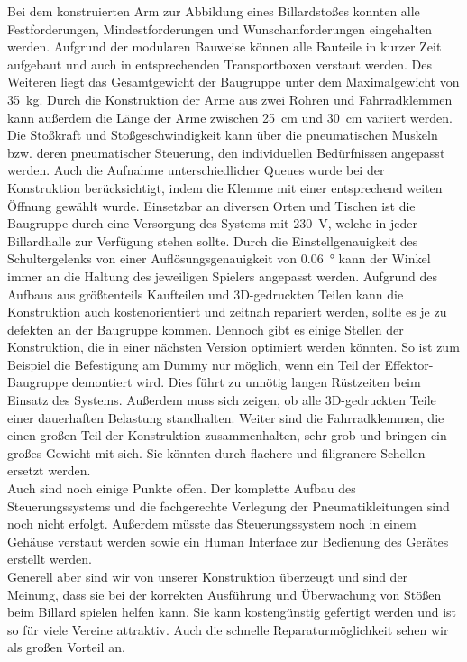	Bei dem konstruierten Arm zur Abbildung eines Billardstoßes konnten alle Festforderungen, Mindestforderungen und Wunschanforderungen eingehalten werden.
	Aufgrund der modularen Bauweise können alle Bauteile in kurzer Zeit aufgebaut und auch in entsprechenden Transportboxen verstaut werden.
	Des Weiteren liegt das Gesamtgewicht der Baugruppe unter dem Maximalgewicht von \SI{35}{\kilo\gram}.
	Durch die Konstruktion der Arme aus zwei Rohren und Fahrradklemmen kann außerdem die Länge der Arme zwischen \SI{25}{\cm} und \SI{30}{\cm} variiert werden.
	Die Stoßkraft und Stoßgeschwindigkeit kann über die pneumatischen Muskeln bzw. deren pneumatischer Steuerung, den individuellen Bedürfnissen angepasst werden.
	Auch die Aufnahme unterschiedlicher Queues wurde bei der Konstruktion berücksichtigt, indem die Klemme mit einer entsprechend weiten Öffnung gewählt wurde.
	Einsetzbar an diversen Orten und Tischen ist die Baugruppe durch eine Versorgung des Systems mit \SI{230}{\volt}, welche in jeder Billardhalle zur Verfügung stehen sollte. 
	Durch die Einstellgenauigkeit des Schultergelenks von einer Auflösungsgenauigkeit von \SI{0,06}{\degree} kann der Winkel immer an die Haltung des jeweiligen Spielers angepasst werden.
	Aufgrund des Aufbaus aus größtenteils Kaufteilen und 3D-gedruckten Teilen kann die Konstruktion auch kostenorientiert und zeitnah repariert werden, sollte es je zu defekten an der Baugruppe kommen.
	Dennoch gibt es einige Stellen der Konstruktion, die in einer nächsten Version optimiert werden könnten.
	So ist zum Beispiel die Befestigung am Dummy nur möglich, wenn ein Teil der Effektor-Baugruppe demontiert wird.
	Dies führt zu unnötig langen Rüstzeiten beim Einsatz des Systems.
	Außerdem muss sich zeigen, ob alle 3D-gedruckten Teile einer dauerhaften Belastung standhalten.
	Weiter sind die Fahrradklemmen, die einen großen Teil der Konstruktion zusammenhalten, sehr grob und bringen ein großes Gewicht mit sich.
	Sie könnten durch flachere und filigranere Schellen ersetzt werden. \\
	Auch sind noch einige Punkte offen.
	Der komplette Aufbau des Steuerungssystems und die fachgerechte Verlegung der Pneumatikleitungen sind noch nicht erfolgt. 
	Außerdem müsste das Steuerungssystem noch in einem Gehäuse verstaut werden sowie ein Human Interface zur Bedienung des Gerätes erstellt werden. \\
	Generell aber sind wir von unserer Konstruktion überzeugt und sind der Meinung, dass sie bei der korrekten Ausführung und Überwachung von Stößen beim Billard spielen helfen kann. 
	Sie kann kostengünstig gefertigt werden und ist so für viele Vereine attraktiv.
	Auch die schnelle Reparaturmöglichkeit sehen wir als großen Vorteil an.
